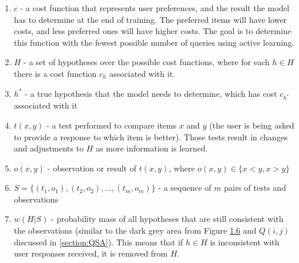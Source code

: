 \documentclass[
  letterpaper,
  DIV=11,
  numbers=noendperiod,
  oneside]{scrreprt}
\theoremstyle{remark}
\begin{document}
\begin{enumerate}
\def\labelenumi{\arabic{enumi}.}
\item
  \(c\) - a cost function that represents user preferences, and the
  result the model has to determine at the end of training. The
  preferred items will have lower costs, and less preferred ones will
  have higher costs. The goal is to determine this function with the
  fewest possible number of queries using active learning.
\item
  \(H\) - a set of hypotheses over the possible cost functions, where
  for each \(h \in H\) there is a cost function \(c_h\) associated with
  it.
\item
  \(h^*\) - a true hypothesis that the model needs to determine, which
  has cost \(c_{h^*}\) associated with it
\item
  \(t(x,y)\) - a test performed to compare items \(x\) and \(y\) (the
  user is being asked to provide a response to which item is better).
  Those tests result in changes and adjustments to \(H\) as more
  information is learned.
\item
  \(o(x,y)\) - observation or result of \(t(x,y)\), where
  \(o(x,y) \in \{x<y, x>y\}\)
\item
  \(S = \{(t_1, o_1), (t_2, o_2),...,(t_m, o_m)\}\) - a sequence of
  \(m\) pairs of tests and observations
\item
  \(w(H|S)\) - probability mass of all hypotheses that are still
  consistent with the observations (similar to the dark grey area from
  Figure \hyperref[fig:dim-space]{1.6} and \(Q(i,j)\) discussed in
  \hyperref[section:QSA]{{[}section:QSA{]}}). This means that if
  \(h \in H\) is inconsistent with user responses received, it is
  removed from \(H\).
\end{enumerate}
\end{document}
